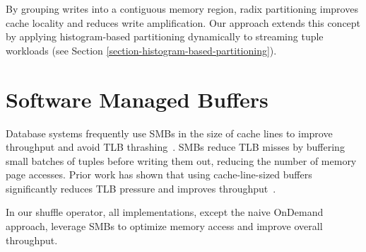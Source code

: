 By grouping writes into a contiguous memory region, radix partitioning improves cache locality and reduces write amplification.
Our approach extends this concept by applying histogram-based partitioning dynamically to streaming tuple workloads (see Section \ref{section-histogram-based-partitioning}).

\section{Software Managed Buffers}\label{sec-rw-smb}
Database systems frequently use \acp{SMB} in the size of cache lines to improve throughput and avoid \ac{TLB} thrashing~\parencite{db-buffer-management, smb-join, smb-partitioning-sort}.
SMBs reduce \ac{TLB} misses by buffering small batches of tuples before writing them out, reducing the number of memory page accesses.
Prior work has shown that using cache-line-sized buffers significantly reduces TLB pressure and improves throughput~\parencite{what-every-programmer-should-know-about-memory}.

In our shuffle operator, all implementations, except the naive OnDemand approach, leverage SMBs to optimize memory access and improve overall throughput.
